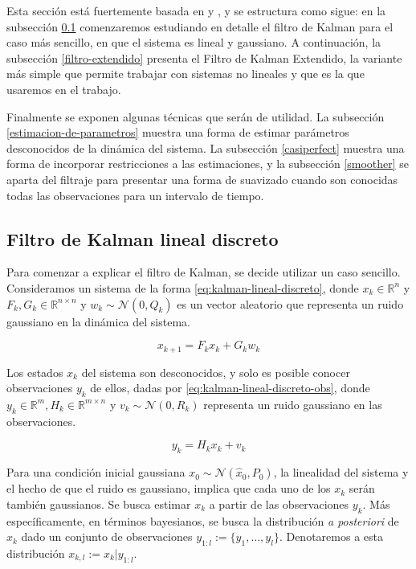 Esta sección está fuertemente basada en \cite{Anderson2005} y \cite{Simon2006}, y se estructura como sigue: en la subsección \ref{filtro-lineal} comenzaremos estudiando en detalle el filtro de Kalman para el caso más sencillo, en que el sistema es lineal y gaussiano. A continuación, la subsección \ref{filtro-extendido} presenta el Filtro de Kalman Extendido, la variante más simple que permite trabajar con sistemas no lineales y que es la que usaremos en el trabajo.

Finalmente se exponen algunas técnicas que serán de utilidad. La subsección \ref{estimacion-de-parametros} muestra una forma de estimar parámetros desconocidos de la dinámica del sistema. La subsección \ref{casiperfect} muestra una forma de incorporar restricciones a las estimaciones, y la subsección \ref{smoother} se aparta del filtraje para presentar una forma de suavizado cuando son conocidas todas las observaciones para un intervalo de tiempo.

\subsection{Filtro de Kalman lineal discreto}\label{filtro-lineal}

Para comenzar a explicar el filtro de Kalman, se decide utilizar un caso sencillo. Consideramos un sistema de la forma \ref{eq:kalman-lineal-discreto}, donde \(x_k \in \mathbb{R}^{n}\) y \(F_k, G_k \in \mathbb{R}^{n \times n}\) y \(w_k \sim \mathcal{N}(0,Q_k)\) es un vector aleatorio que representa un ruido gaussiano en la dinámica del sistema. 

\begin{equation}\label{eq:kalman-lineal-discreto}
x_{k+1} = F_k x_k + G_k w_k
\end{equation}

Los estados \(x_k\) del sistema son desconocidos, y solo es posible conocer observaciones \(y_k\) de ellos, dadas por \ref{eq:kalman-lineal-discreto-obs}, donde \(y_k \in \mathbb{R}^{m}, H_k \in \mathbb{R}^{m \times n}\) y \( v_k \sim \mathcal{N}(0, R_k)\) representa un ruido gaussiano en las observaciones.

\begin{equation}\label{eq:kalman-lineal-discreto-obs}
y_k = H_k x_k  + v_k
\end{equation}


Para una condición inicial gaussiana \(x_0 \sim \mathcal{N}(\hat{x}_0, P_0)\), la linealidad del sistema y el hecho de que el ruido es gaussiano, implica que cada uno de los \(x_k\) serán también gaussianos. Se busca estimar \(x_k\) a partir de las observaciones \(y_k\). Más específicamente, en términos bayesianos, se busca la distribución \textit{a posteriori} de \(x_k\) dado un conjunto de observaciones \(y_{1:l} := \{y_1, \dots, y_l\}\). Denotaremos a esta distribución \(x_{k,l}:= x_k | y_{1:l}\).

